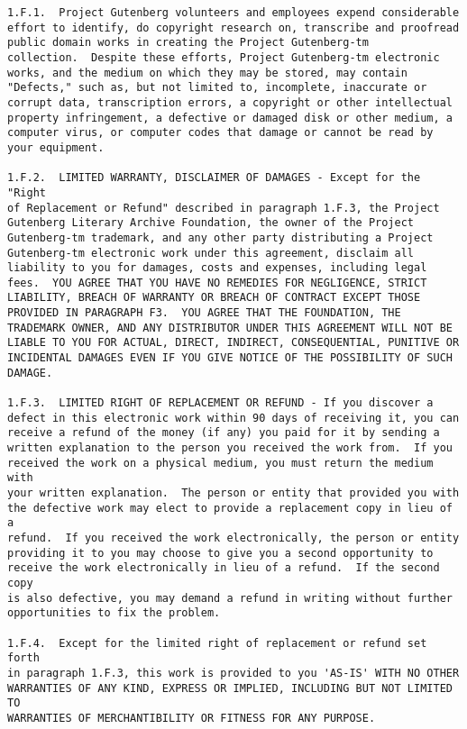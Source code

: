\documentclass[
]{article}
\begin{document}
\begin{verbatim}
1.F.1.  Project Gutenberg volunteers and employees expend considerable
effort to identify, do copyright research on, transcribe and proofread
public domain works in creating the Project Gutenberg-tm
collection.  Despite these efforts, Project Gutenberg-tm electronic
works, and the medium on which they may be stored, may contain
"Defects," such as, but not limited to, incomplete, inaccurate or
corrupt data, transcription errors, a copyright or other intellectual
property infringement, a defective or damaged disk or other medium, a
computer virus, or computer codes that damage or cannot be read by
your equipment.

1.F.2.  LIMITED WARRANTY, DISCLAIMER OF DAMAGES - Except for the "Right
of Replacement or Refund" described in paragraph 1.F.3, the Project
Gutenberg Literary Archive Foundation, the owner of the Project
Gutenberg-tm trademark, and any other party distributing a Project
Gutenberg-tm electronic work under this agreement, disclaim all
liability to you for damages, costs and expenses, including legal
fees.  YOU AGREE THAT YOU HAVE NO REMEDIES FOR NEGLIGENCE, STRICT
LIABILITY, BREACH OF WARRANTY OR BREACH OF CONTRACT EXCEPT THOSE
PROVIDED IN PARAGRAPH F3.  YOU AGREE THAT THE FOUNDATION, THE
TRADEMARK OWNER, AND ANY DISTRIBUTOR UNDER THIS AGREEMENT WILL NOT BE
LIABLE TO YOU FOR ACTUAL, DIRECT, INDIRECT, CONSEQUENTIAL, PUNITIVE OR
INCIDENTAL DAMAGES EVEN IF YOU GIVE NOTICE OF THE POSSIBILITY OF SUCH
DAMAGE.

1.F.3.  LIMITED RIGHT OF REPLACEMENT OR REFUND - If you discover a
defect in this electronic work within 90 days of receiving it, you can
receive a refund of the money (if any) you paid for it by sending a
written explanation to the person you received the work from.  If you
received the work on a physical medium, you must return the medium with
your written explanation.  The person or entity that provided you with
the defective work may elect to provide a replacement copy in lieu of a
refund.  If you received the work electronically, the person or entity
providing it to you may choose to give you a second opportunity to
receive the work electronically in lieu of a refund.  If the second copy
is also defective, you may demand a refund in writing without further
opportunities to fix the problem.

1.F.4.  Except for the limited right of replacement or refund set forth
in paragraph 1.F.3, this work is provided to you 'AS-IS' WITH NO OTHER
WARRANTIES OF ANY KIND, EXPRESS OR IMPLIED, INCLUDING BUT NOT LIMITED TO
WARRANTIES OF MERCHANTIBILITY OR FITNESS FOR ANY PURPOSE.


\end{verbatim}
\end{document}
